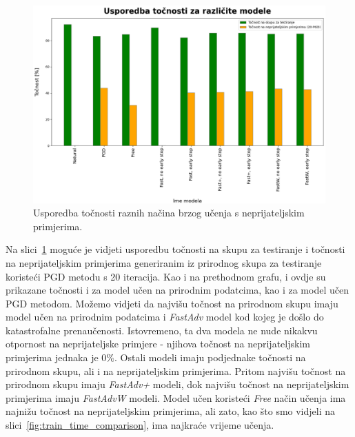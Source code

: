 \documentclass[times, utf8, zavrsni, numeric]{fer}
\begin{document}
\begin{figure}[htb]
    \centering
    \includegraphics[scale=0.42]{../stats/stats_comparison.png}
    \caption{Usporedba točnosti raznih načina brzog učenja s neprijateljskim primjerima.}
    \label{fig:acc_comparison}
\end{figure}

Na slici~\ref{fig:acc_comparison} moguće je vidjeti usporedbu točnosti na skupu za testiranje i točnosti na neprijateljskim primjerima generiranim iz prirodnog skupa za testiranje koristeći PGD metodu s 20 iteracija.
Kao i na prethodnom grafu, i ovdje su prikazane točnosti i za model učen na prirodnim podatcima, kao i za model učen PGD metodom.
Možemo vidjeti da najvišu točnost na prirodnom skupu imaju model učen na prirodnim podatcima i \textit{FastAdv} model kod kojeg je došlo do katastrofalne prenaučenosti.
Istovremeno, ta dva modela ne nude nikakvu otpornost na neprijateljske primjere - njihova točnost na neprijateljskim primjerima jednaka je $0\%$.
Ostali modeli imaju podjednake točnosti na prirodnom skupu, ali i na neprijateljskim primjerima.
Pritom najvišu točnost na prirodnom skupu imaju \textit{FastAdv+} modeli, dok najvišu točnost na neprijateljskim primjerima imaju \textit{FastAdvW} modeli.
Model učen koristeći \textit{Free} način učenja ima najnižu točnost na neprijateljskim primjerima, ali zato, kao što smo vidjeli na slici~\ref{fig:train_time_comparison}, ima najkraće vrijeme učenja.
\end{document}
